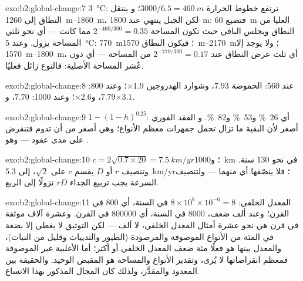 \begin{solution}{exo:b2:global-change:7}
\qty{3}{\celsius}: ترتفع خطوط الحرارة $3000/6.5 = \qty{460}{m}$؛ و
ينتقل النطاق إلى \qtyrange{1260}{1860}{m}، لكن الجبل ينتهي عند
\qty{1800}{m}: فتضيع \qty{60}{m} العليا من النطاق ويجلس الباقي
حيث تكون المساحة $2^{-460/300} = 0.35$ مما كانت --- أي نحو
ثلثي المساحة يزول. وعند \qty{5}{\celsius}: \qty{770}{m}؛ فيكون
النطاق \qtyrange{1570}{2170}{m}؛ ولا يوجد إلا \qtyrange{1570}{1800}{m}،
أي ثلث عرض النطاق عند $2^{-770/300} = 0.17$ من
المساحة --- أي دون عُشر المساحة الأصلية: فالنوع
زائل فعليًا.
\end{solution}

\begin{solution}{exo:b2:global-change:8}
عند 560: الحموضة $7.93$، وشوارد الهدروجين $\times 1.9$؛ وعند 800: $7.79$، و$\times
2.6$؛ وعند 1000: $7.70$، و$\times 3.1$.
\end{solution}

\begin{solution}{exo:b2:global-change:9}
$1 - (1 - h)^{0.25}$: أي \qty{26}{\%} و\qty{53}{\%} و\qty{82}{\%}. و
الفقد الفوري أصغر لأن البقية ما تزال تحمل
جمهرات معظم الأنواع؛ وهي أصغر من أن تدوم
فتنقرض على مدى عقود --- وهو .
\end{solution}

\begin{solution}{exo:b2:global-change:10}
$c = 2\sqrt{0.7\times 20} = \qty{7.5}{km/yr}$؛ و\qty{1000}{km} في
نحو 130 سنة. وتنصيف $r$ أو $D$ يقسم $c$ على
$\sqrt 2$، إلى \qty{5.3}{km/yr}؛ فلا ينصّفها أي منهما --- ولتنصيف
السرعة يجب تربيع الجداء $rD$ نزولًا إلى الربع.
\end{solution}

\begin{solution}{exo:b2:global-change:11}
المعدل الخلفي: $8\times 10^{6}\times 10^{-6} = 8$ في السنة، أي 800 في
القرن؛ وعند ألف ضعف، 8000 في السنة، أي \num{800000} في القرن.
وعشرة آلاف موثقة في قرن هي نحو عشرة أمثال
المعدل الخلفي، لا ألف --- لكن التوثيق لا يغطي إلا
بضعة في المئة من الأنواع الموصوفة والمرصودة (الطيور
والثدييات وقليل من النبات)، والمعدل بينها هو فعلًا مئة
ضعف المعدل الخلفي أو أكثر؛ أما الأغلبية غير الموصوفة فمعظم
انقراضاتها لا يُرى، وتقدير الأنواع والمساحة هو
المقبض الوحيد. والحقيقة بين المعدود
والمقدَّر، ولذلك كان المجال المذكور بهذا الاتساع.
\end{solution}

